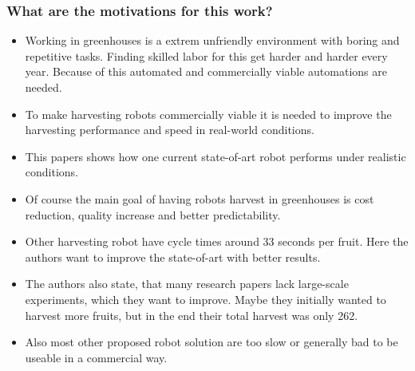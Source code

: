 \documentclass{article}
\begin{document}
\subsubsection*{What are the motivations for this work?}
\begin{itemize}
    \item Working in greenhouses is a extrem unfriendly environment with boring and repetitive tasks. Finding skilled
    labor for this get harder and harder every year. Because of this automated and commercially viable automations are needed.
    \item To make harvesting robots commercially viable it is needed to improve the harvesting performance and speed in real-world conditions.
    \item This papers shows how one current state-of-art robot performs under realistic conditions.
    \item Of course the main goal of having robots harvest in greenhouses is cost reduction, quality increase and 
    better predictability.
    \item Other harvesting robot have cycle times around 33 seconds per fruit. Here the authors want to improve the state-of-art with better results.
    \item The authors also state, that many research papers lack large-scale experiments, which they want to improve. 
    Maybe they initially wanted to harvest more fruits, but in the end their total harvest was only 262.
    \item Also most other proposed robot solution are too slow or generally bad to be useable in a commercial way.
\end{itemize}
\end{document}
